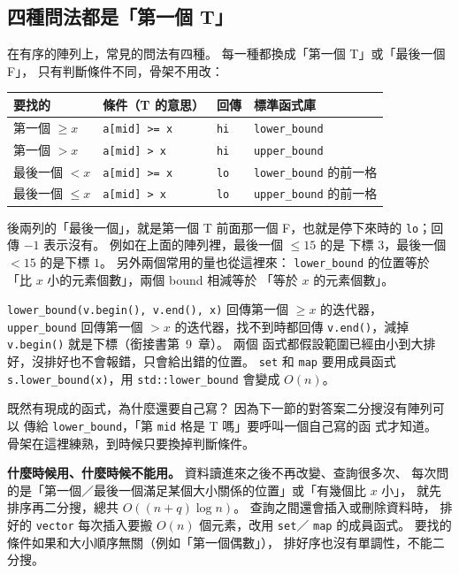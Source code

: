 \subsection{四種問法都是「第一個 T」}
\label{sec:bs-four}

在有序的陣列上，常見的問法有四種。 每一種都換成「第一個 T」或「最後一個 F」，
只有判斷條件不同，骨架不用改：

\begin{center}
\begin{tabular}{llll}
\toprule
要找的 & 條件（T 的意思） & 回傳 & 標準函式庫 \\
\midrule
第一個 $\ge x$ & \texttt{a[mid] >= x} & \texttt{hi} & \texttt{lower\_bound} \\
第一個 $> x$ & \texttt{a[mid] > x} & \texttt{hi} & \texttt{upper\_bound} \\
最後一個 $< x$ & \texttt{a[mid] >= x} & \texttt{lo} & \texttt{lower\_bound} 的前一格 \\
最後一個 $\le x$ & \texttt{a[mid] > x} & \texttt{lo} & \texttt{upper\_bound} 的前一格 \\
\bottomrule
\end{tabular}
\end{center}

後兩列的「最後一個」，就是第一個 T 前面那一個 F，也就是停下來時的
\texttt{lo}；回傳 $-1$ 表示沒有。 例如在上面的陣列裡，最後一個 $\le 15$ 的是
下標 $3$，最後一個 $< 15$ 的是下標 $1$。 另外兩個常用的量也從這裡來：
\texttt{lower\_bound} 的位置等於「比 $x$ 小的元素個數」，兩個 bound 相減等於
「等於 $x$ 的元素個數」。

\begin{bridgerecap}
\texttt{lower\_bound(v.begin(), v.end(), x)} 回傳第一個 $\ge x$ 的迭代器，
\texttt{upper\_bound} 回傳第一個 $> x$ 的迭代器，找不到時都回傳
\texttt{v.end()}，減掉 \texttt{v.begin()} 就是下標（銜接書第~9~章）。 兩個
函式都假設範圍已經由小到大排好，沒排好也不會報錯，只會給出錯的位置。
\texttt{set} 和 \texttt{map} 要用成員函式 \texttt{s.lower\_bound(x)}，用
\texttt{std::lower\_bound} 會變成 $O(n)$。
\end{bridgerecap}

既然有現成的函式，為什麼還要自己寫？ 因為下一節的對答案二分搜沒有陣列可以
傳給 \texttt{lower\_bound}，「第 \texttt{mid} 格是 T 嗎」要呼叫一個自己寫的函
式才知道。 骨架在這裡練熟，到時候只要換掉判斷條件。

\textbf{什麼時候用、什麼時候不能用。} 資料讀進來之後不再改變、查詢很多次、
每次問的是「第一個／最後一個滿足某個大小關係的位置」或「有幾個比 $x$ 小」，
就先排序再二分搜，總共 $O((n + q) \log n)$。 查詢之間還會插入或刪除資料時，
排好的 \texttt{vector} 每次插入要搬 $O(n)$ 個元素，改用 \texttt{set}／
\texttt{map} 的成員函式。 要找的條件如果和大小順序無關（例如「第一個偶數」），
排好序也沒有單調性，不能二分搜。

